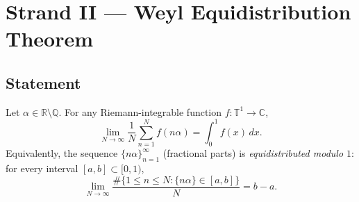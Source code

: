 \section{Strand II — Weyl Equidistribution Theorem}
\label{sec:ch18-weyl}

\subsection{Statement}\label{subsec:ch18-weyl-statement}

\begin{theorem}\label{thm:weyl-equidist}
Let $\alpha \in \mathbb{R}\setminus\mathbb{Q}$.
For any Riemann-integrable function $f: \mathbb{T}^1 \to \mathbb{C}$,
\begin{equation}\label{eq:weyl-equidist}
  \lim_{N\to\infty} \frac{1}{N}\sum_{n=1}^{N} f(n\alpha) = \int_0^1 f(x)\, dx.
\end{equation}
Equivalently, the sequence $\{n\alpha\}_{n=1}^\infty$ (fractional parts)
is \emph{equidistributed modulo $1$}: for every interval $[a,b] \subset [0,1)$,
\begin{equation}\label{eq:equidist-intervals}
  \lim_{N\to\infty} \frac{\#\{1 \le n \le N : \{n\alpha\} \in [a,b]\}}{N} = b - a.
\end{equation}
\end{theorem}

